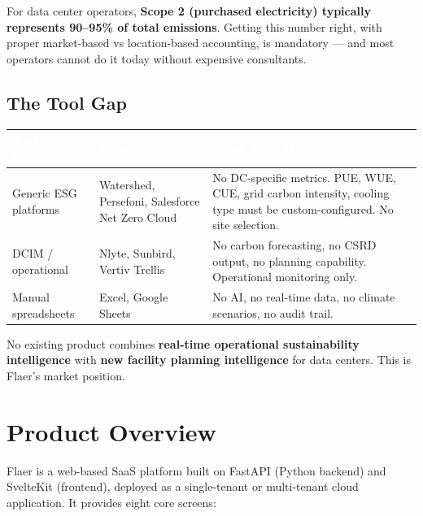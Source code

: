 \documentclass[11pt, a4paper]{article}
\newcommand{\tableheader}[1]{\cellcolor{flaergreen!90}\textcolor{white}{\textbf{\small #1}}}
\begin{document}
For data center operators, \textbf{Scope 2 (purchased electricity) typically represents 90--95\% of total emissions}. Getting this number right, with proper market-based vs location-based accounting, is mandatory — and most operators cannot do it today without expensive consultants.

\subsection{The Tool Gap}

\vspace{0.3cm}
\begin{tabular}{p{3cm} p{3.8cm} p{7.2cm}}
  \toprule
  \tableheader{Tool Category} & \tableheader{Examples} & \tableheader{What They Miss} \\
  \midrule
  Generic ESG platforms & Watershed, Persefoni, Salesforce Net Zero Cloud & No DC-specific metrics. PUE, WUE, CUE, grid carbon intensity, cooling type must be custom-configured. No site selection. \\
  \rowcolor{rowalt} DCIM / operational & Nlyte, Sunbird, Vertiv Trellis & No carbon forecasting, no CSRD output, no planning capability. Operational monitoring only. \\
  Manual spreadsheets & Excel, Google Sheets & No AI, no real-time data, no climate scenarios, no audit trail. \\
  \bottomrule
\end{tabular}

\vspace{0.5cm}

\begin{tcolorbox}[redbox, title=The Gap]
No existing product combines \textbf{real-time operational sustainability intelligence} with \textbf{new facility planning intelligence} for data centers. This is Flaer's market position.
\end{tcolorbox}

\section{Product Overview}

Flaer is a web-based SaaS platform built on FastAPI (Python backend) and SvelteKit (frontend), deployed as a single-tenant or multi-tenant cloud application. It provides eight core screens:
\end{document}
